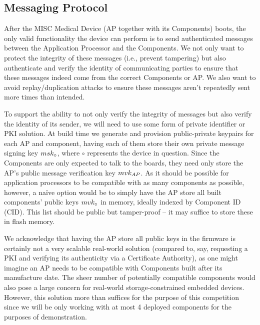 \subsection{Messaging Protocol}

After the MISC Medical Device (AP together with its Components) boots, the only valid functionality the device can perform is to send authenticated messages between the Application Processor and the Components. We not only want to protect the integrity of these messages (i.e., prevent tampering) but also authenticate and verify the identity of communicating parties to ensure that these messages indeed come from the correct Components or AP. We also want to avoid replay/duplication attacks to ensure these messages aren't repeatedly sent more times than intended.


To support the ability to not only verify the integrity of messages but also verify the identity of its sender, we will need to use some form of private identifier or PKI solution. At build time we generate and provision public-private keypairs for each AP and component, having each of them store their own private message signing key $msk_\circ$, where $\circ$ represents the device in question. Since the Components are only expected to talk to the boards, they need only store the AP's public message verification key $mvk_{AP}$. As it should be possible for application processors to be compatible with as many components as possible, however, a na{\"i}ve option would be to simply have the AP store all built components' public keys $mvk_\circ$ in memory, ideally indexed by Component ID (CID). This list should be public but tamper-proof -- it may suffice to store these in flash memory.

We acknowledge that having the AP store all public keys in the firmware is certainly not a very scalable real-world solution (compared to, say, requesting a PKI and verifying its authenticity via a Certificate Authority), as one might imagine an AP needs to be compatible with Components built after its manufacture date. The sheer number of potentially compatible components would also pose a large concern for real-world storage-constrained embedded devices. However, this solution more than suffices for the purpose of this competition since we will be only working with at most 4 deployed components for the purposes of demonstration.

